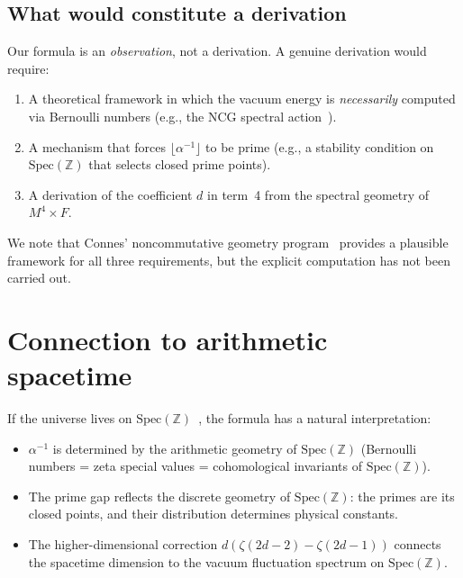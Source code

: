 \documentclass[11pt,a4paper]{article}
\newcommand{\Spec}{\mathrm{Spec}}
\begin{document}
\subsection{What would constitute a derivation}

Our formula is an \emph{observation}, not a derivation.
A genuine derivation would require:

\begin{enumerate}
\item A theoretical framework in which the vacuum energy
  is \emph{necessarily} computed via Bernoulli numbers
  (e.g., the NCG spectral action~\cite{CCM2007}).
\item A mechanism that forces $\lfloor\alpha^{-1}\rfloor$
  to be prime (e.g., a stability condition on $\Spec(\mathbb{Z})$
  that selects closed prime points).
\item A derivation of the coefficient $d$ in term~4 from
  the spectral geometry of $M^4 \times F$.
\end{enumerate}

We note that Connes' noncommutative geometry
program~\cite{Connes1996,CCM2007} provides a plausible
framework for all three requirements, but the explicit
computation has not been carried out.

\section{Connection to arithmetic spacetime}
\label{sec:connection}

If the universe lives on $\Spec(\mathbb{Z})$~\cite{paper_F},
the formula has a natural interpretation:

\begin{itemize}
\item $\alpha^{-1}$ is determined by the arithmetic geometry of
  $\Spec(\mathbb{Z})$ (Bernoulli numbers = zeta special values
  = cohomological invariants of $\Spec(\mathbb{Z})$).
\item The prime gap reflects the discrete geometry of
  $\Spec(\mathbb{Z})$: the primes are its closed points,
  and their distribution determines physical constants.
\item The higher-dimensional correction $d(\zeta(2d{-}2) - \zeta(2d{-}1))$
  connects the spacetime dimension to the vacuum fluctuation
  spectrum on $\Spec(\mathbb{Z})$.
\end{itemize}
\end{document}
